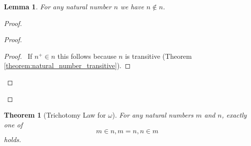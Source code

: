 \documentclass{article}
\let\qed\relax
\newtheorem{lemma}[axiom]{Lemma}
\newtheorem{theorem}[axiom]{Theorem}
\theoremstyle{definition}
\begin{document}
    \begin{lemma}
        \label{lemma:natural_number_irreflexive}
        For any natural number $n$ we have $n \notin n$.
    \end{lemma}

    \begin{proof}
        \pf
        \begin{proof}
            \begin{proof}
                \pf\ If $n^+ \in n$ this follows because $n$ is transitive (Theorem \ref{theorem:natural_number_transitive}).
            \end{proof}
        \end{proof}
        \qed
    \end{proof}

    \begin{theorem}[Trichotomy Law for $\omega$]
        For any natural numbers $m$ and $n$, exactly one of
        \[ m \in n, m = n, n \in m \]
        holds.
    \end{theorem}
\end{document}

